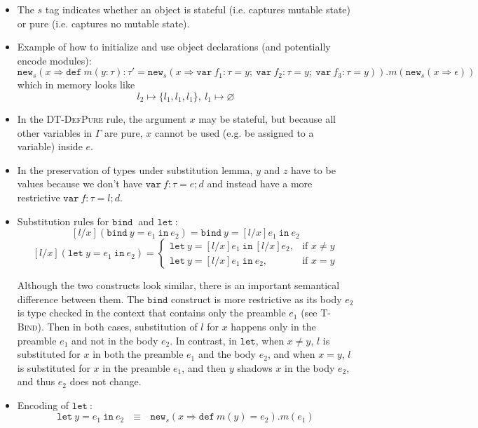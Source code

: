 \documentclass{llncs}
\newcommand{\keywadj}[1]{\mathtt{#1}}
\newcommand{\keyw}[1]{\keywadj{#1}~}
\begin{document}
\begin{itemize}
\item The $s$ tag indicates whether an object is stateful (i.e. captures mutable state) or pure (i.e. captures no mutable state).
\item Example of how to initialize and use object declarations (and potentially encode modules):
\[
\keywadj{new}_{s}(x \Rightarrow \keyw{def} m(y : \tau) : \tau' = \keywadj{new}_{s}(x \Rightarrow \keyw{var} f_1 : \tau = y;~\keyw{var} f_2 : \tau = y;~\keyw{var} f_3 : \tau = y)).m(\keywadj{new}_{s} (x \Rightarrow \epsilon))
\]
which in memory looks like 
\[
l_2 \mapsto \{l_1,l_1,l_1\},~l_1 \mapsto \varnothing
\]
\item In the \textsc{DT-DefPure} rule, the argument $x$ may be stateful, but because all other variables in $\Gamma$ are pure, $x$ cannot be used (e.g. be assigned to a variable) inside $e$.
\item In the preservation of types under substitution lemma, $y$ and $z$ have to be values because we don't have $\keyw{var} f:\tau = e; d$ and instead have a more restrictive $\keyw{var} f:\tau = l;d$.
\item Substitution rules for $\keyw{bind}$ and $\keyw{let}$:
\[
    [l/x](\keyw{bind} y = e_1~\keyw{in} e_2) = \keyw{bind} y = [l/x]e_1~\keyw{in} e_2
\]
\[
    [l/x](\keyw{let} y = e_1~\keyw{in} e_2) = 
\begin{cases}
    \keyw{let} y = [l/x]e_1~\keyw{in} [l/x]e_2, & \text{if } x \not= y\\
    \keyw{let} y = [l/x]e_1~\keyw{in} e_2, & \text{if } x = y
\end{cases}
\]

Although the two constructs look similar, there is an important semantical difference between them. The $\keywadj{bind}$ construct is more restrictive as its body $e_2$ is type checked in the context that contains only the preamble $e_1$ (see \textsc{T-Bind}). Then in both cases, substitution of $l$ for $x$ happens only in the preamble $e_1$ and not in the body $e_2$. In contrast, in $\keywadj{let}$, when $x \not= y$, $l$ is substituted for $x$ in both the preamble $e_1$ and the body $e_2$, and when $x = y$, $l$ is substituted for $x$ in the preamble $e_1$, and then $y$ shadows $x$ in the body $e_2$, and thus $e_2$ does not change. 

\item Encoding of $\keyw{let}$:
\[
\keyw{let} y = e_1~\keyw{in} e_2~~~\equiv~~~\keywadj{new}_s(x \Rightarrow \keyw{def} m(y) = e_2).m(e_1)
\]

\end{itemize}
\end{document}
